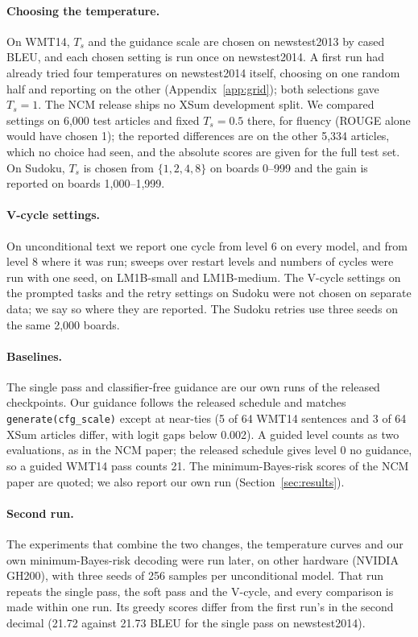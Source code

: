 \documentclass[11pt]{article}
\begin{document}
\paragraph{Choosing the temperature.} On WMT14, $T_s$ and the guidance scale are chosen on newstest2013 by cased BLEU,
and each chosen setting is run once on newstest2014. A first run had already tried four temperatures on newstest2014
itself, choosing on one random half and reporting on the other (Appendix~\ref{app:grid}); both selections gave
$T_s=1$. The NCM release ships no XSum development split. We compared settings on 6,000 test articles and fixed
$T_s=0.5$ there, for fluency (ROUGE alone would have chosen 1); the reported differences are on the other 5,334
articles, which no choice had seen, and the absolute scores are given for the full test set. On Sudoku, $T_s$ is chosen from
$\{1,2,4,8\}$ on boards 0--999 and the gain is reported on boards 1,000--1,999.

\paragraph{V-cycle settings.} On unconditional text we report one cycle from level 6 on every model, and from level 8
where it was run; sweeps over restart levels and numbers of cycles were run with one seed, on LM1B-small and
LM1B-medium. The V-cycle settings
on the prompted tasks and the retry settings on Sudoku were not chosen on separate data; we say so where they are
reported. The Sudoku retries use three seeds on the same 2,000 boards.

\paragraph{Baselines.} The single pass and classifier-free guidance are our own runs of the released checkpoints. Our
guidance follows the released schedule and matches \texttt{generate(cfg\_scale)} except at near-ties (5 of 64 WMT14
sentences and 3 of 64 XSum articles differ, with logit gaps below 0.002). A guided level counts as two evaluations, as
in the NCM paper; the released schedule gives level 0 no guidance, so a guided WMT14 pass counts 21. The
minimum-Bayes-risk scores of the NCM paper are quoted; we also report our own run (Section~\ref{sec:results}).

\paragraph{Second run.} The experiments that combine the two changes, the temperature curves and our own
minimum-Bayes-risk decoding were run later, on other hardware (NVIDIA GH200), with three seeds of 256 samples per
unconditional model. That run repeats the single pass, the soft pass and the V-cycle, and every comparison is made
within one run. Its greedy scores differ from the first run's in the second decimal (21.72 against 21.73 BLEU for the
single pass on newstest2014).
\end{document}
